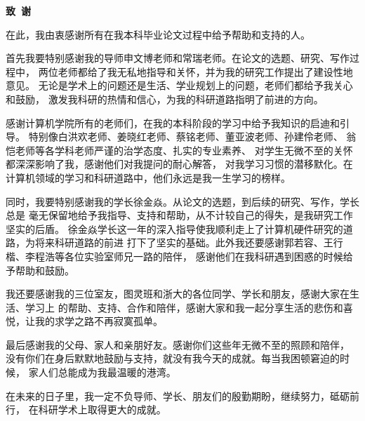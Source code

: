 \cleardoublepage{}
\begin{center}
    \bfseries {} 致~谢
\end{center}

在此，我由衷感谢所有在我本科毕业论文过程中给予帮助和支持的人。\par

首先我要特别感谢我的导师申文博老师和常瑞老师。在论文的选题、研究、写作过程中，
两位老师都给了我无私地指导和关怀，并为我的研究工作提出了建设性地意见。
无论是学术上的问题还是生活、学业规划上的问题，老师们都给予我关心和鼓励，
激发我科研的热情和信心，为我的科研道路指明了前进的方向。\par

感谢计算机学院所有的老师们，在我的本科阶段的学习中给予我知识的启迪和引导。
特别像白洪欢老师、姜晓红老师、蔡铭老师、董亚波老师、孙建伶老师、
翁恺老师等各学科老师严谨的治学态度、扎实的专业素养、
对学生无微不至的关怀都深深影响了我，感谢他们对我提问的耐心解答，
对我学习习惯的潜移默化。在计算机领域的学习和科研道路中，他们永远是我一生学习的榜样。\par

同时，我要特别感谢我的学长徐金焱。从论文的选题，到后续的研究、写作，学长总是
毫无保留地给予我指导、支持和帮助，从不计较自己的得失，是我研究工作坚实的后盾。
徐金焱学长这一年的深入指导使我顺利走上了计算机硬件研究的道路，为将来科研道路的前进
打下了坚实的基础。此外我还要感谢郭若容、王行楷、李程浩等各位实验室师兄一路的陪伴，
感谢他们在我科研遇到困惑的时候给予帮助和鼓励。\par

我还要感谢我的三位室友，图灵班和浙大的各位同学、学长和朋友，感谢大家在生活、学习上
的帮助、支持、合作和陪伴，感谢大家和我一起分享生活的悲伤和喜悦，让我的求学之路不再寂寞孤单。\par

最后感谢我的父母、家人和亲朋好友。感谢你们这些年无微不至的照顾和陪伴，
没有你们在身后默默地鼓励与支持，就没有我今天的成就。每当我困顿窘迫的时候，
家人们总能成为我最温暖的港湾。\par

在未来的日子里，我一定不负导师、学长、朋友们的殷勤期盼，继续努力，砥砺前行，
在科研学术上取得更大的成就。\par